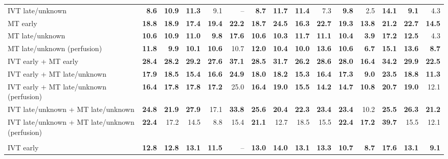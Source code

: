 \begin{landscape}
{\begin{longtable}{p{4.9cm}rrrrrrrrrrrrrr}
IVT late/unknown & \textbf{8.6} & \textbf{10.9} & \textbf{11.3} & 9.1 & -- & \textbf{8.7} & \textbf{11.7} & \textbf{11.4} & 7.3 & \textbf{9.8} & 2.5 & \textbf{14.1} & \textbf{9.1} & 4.3 \\
MT early & \textbf{18.8} & \textbf{18.9} & \textbf{17.4} & \textbf{19.4} & \textbf{22.2} & \textbf{18.7} & \textbf{24.5} & \textbf{16.3} & \textbf{22.7} & \textbf{19.3} & \textbf{13.8} & \textbf{21.2} & \textbf{22.7} & \textbf{14.5} \\
MT late/unknown & \textbf{10.6} & \textbf{10.9} & \textbf{11.0} & \textbf{9.8} & \textbf{17.6} & \textbf{10.6} & \textbf{10.3} & \textbf{11.7} & \textbf{11.1} & \textbf{10.4} & \textbf{3.9} & \textbf{17.2} & \textbf{12.5} & 4.3 \\
MT late/unknown (perfusion) & \textbf{11.8} & \textbf{9.9} & \textbf{10.1} & \textbf{10.6} & 10.7 & \textbf{12.0} & \textbf{10.4} & \textbf{10.0} & \textbf{13.6} & \textbf{10.6} & \textbf{6.7} & \textbf{15.1} & \textbf{13.6} & \textbf{8.7} \\
IVT early + MT early & \textbf{28.4} & \textbf{28.2} & \textbf{29.2} & \textbf{27.6} & \textbf{37.1} & \textbf{28.5} & \textbf{31.7} & \textbf{26.2} & \textbf{28.6} & \textbf{28.0} & \textbf{16.4} & \textbf{34.2} & \textbf{29.9} & \textbf{22.5} \\
IVT early + MT late/unknown & \textbf{17.9} & \textbf{18.5} & \textbf{15.4} & \textbf{16.6} & \textbf{24.9} & \textbf{18.0} & \textbf{18.2} & \textbf{15.3} & \textbf{16.4} & \textbf{17.3} & \textbf{9.0} & \textbf{23.5} & \textbf{18.8} & \textbf{11.3} \\
IVT early + MT late/unknown (perfusion) & \textbf{16.4} & \textbf{17.8} & \textbf{17.8} & \textbf{17.2} & 25.0 & \textbf{16.4} & \textbf{19.0} & \textbf{15.5} & \textbf{14.2} & \textbf{14.7} & \textbf{10.8} & \textbf{20.7} & \textbf{19.0} & 12.1 \\
IVT late/unknown + MT late/unknown & \textbf{24.8} & \textbf{21.9} & \textbf{27.9} & 17.1 & \textbf{33.8} & \textbf{25.6} & \textbf{20.4} & \textbf{22.3} & \textbf{23.4} & \textbf{23.4} & 10.2 & \textbf{25.5} & \textbf{26.3} & \textbf{21.2} \\
IVT late/unknown + MT late/unknown (perfusion) & \textbf{22.4} & 17.2 & 14.5 & 8.8 & 15.4 & \textbf{21.1} & 12.7 & 18.5 & 15.5 & \textbf{22.4} & \textbf{17.2} & \textbf{39.7} & 15.5 & 12.1 \\
\addlinespace
\multicolumn{15}{l}{\textbf{NIHSS 21--25}}\\
IVT early & \textbf{12.8} & \textbf{12.8} & \textbf{13.1} & \textbf{11.5} & -- & \textbf{13.0} & \textbf{14.0} & \textbf{13.1} & \textbf{13.3} & \textbf{10.7} & \textbf{8.7} & \textbf{17.6} & \textbf{13.1} & \textbf{9.1} \\

\end{longtable}}
\end{landscape}
